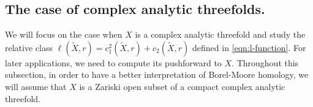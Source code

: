 \documentclass[12pt]{amsart}
\newcommand{\mbC}{\mathbb{C}}
\newcommand{\mbQ}{\mathbb{Q}}
\newcommand{\<}{\leq}
\def\subset{\subseteq}
\def\mcE{\mathcal{E}}
\def\mcF{\mathcal{F}}
\newtheorem{lemma}[theorem]{Lemma}
\theoremstyle{remark}
\theoremstyle{definition}
\theoremstyle{definition}
\numberwithin{equation}{section}
\theoremstyle{definition}
\theoremstyle{definition}
\def\dim{\operatorname{dim}}
\def\orb{\mathrm{orb}}
\begin{document}
%




\subsection{The case of complex analytic threefolds.} 
We will focus on the case when $X$ is a complex analytic threefold and study the relative class $\ell(\widetilde{X},r) =  c_1^2(\widetilde{X},r) + c_2(\widetilde{X},r)$ defined in  \eqref{eqn:l-function}. 
For later applications, we need to  compute its pushforward   to $X$.  
Throughout this subsection, in order to have a better interpretation of Borel-Moore homology, 
we will assume that $X$ is a Zariski open subset of a compact complex analytic threefold.



\end{document}
